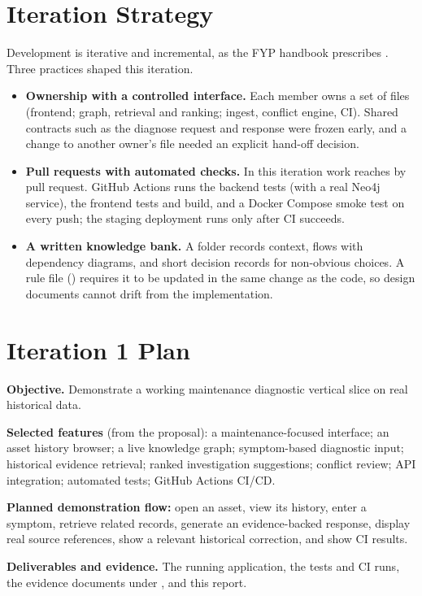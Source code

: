 \section{Iteration Strategy}
Development is iterative and incremental, as the FYP handbook prescribes \citep{fyp-handbook}. Three practices shaped this iteration.
\begin{itemize}
\item \textbf{Ownership with a controlled interface.} Each member owns a set of files (frontend; graph, retrieval and ranking; ingest, conflict engine, CI). Shared contracts such as the diagnose request and response were frozen early, and a change to another owner's file needed an explicit hand-off decision.
\item \textbf{Pull requests with automated checks.} In this iteration work reaches  by pull request. GitHub Actions runs the backend tests (with a real Neo4j service), the frontend tests and build, and a Docker Compose smoke test on every push; the staging deployment runs only after CI succeeds.
\item \textbf{A written knowledge bank.} A  folder records context, flows with dependency diagrams, and short decision records for non-obvious choices. A rule file () requires it to be updated in the same change as the code, so design documents cannot drift from the implementation.
\end{itemize}

\section{Iteration 1 Plan}
\textbf{Objective.} Demonstrate a working maintenance diagnostic vertical slice on real historical data.

\textbf{Selected features} (from the proposal): a maintenance-focused interface; an asset history browser; a live knowledge graph; symptom-based diagnostic input; historical evidence retrieval; ranked investigation suggestions; conflict review; API integration; automated tests; GitHub Actions CI/CD.

\textbf{Planned demonstration flow:} open an asset, view its history, enter a symptom, retrieve related records, generate an evidence-backed response, display real source references, show a relevant historical correction, and show CI results.

\textbf{Deliverables and evidence.} The running application, the tests and CI runs, the evidence documents under , and this report.

